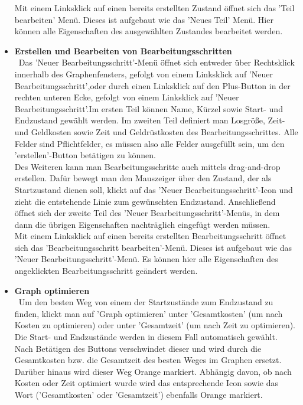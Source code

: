 \documentclass[twoside]{report}
\begin{document}
\begin{itemize}
      Mit einem Linksklick auf einen bereits erstellten Zustand öffnet sich das 'Teil bearbeiten' Menü. Dieses ist aufgebaut wie das 'Neues Teil' Menü. Hier können alle Eigenschaften des ausgewählten Zustandes bearbeitet werden.
  \item \textbf{ Erstellen und Bearbeiten von Bearbeitungsschritten }
    \\\
      Das 'Neuer Bearbeitungsschritt'-Menü öffnet sich entweder über Rechtsklick innerhalb des Graphenfensters, gefolgt von einem Linksklick auf 'Neuer Bearbeitungsschritt',oder durch einen Linksklick auf den Plus-Button in der rechten unteren Ecke, gefolgt von einem Linksklick auf 'Neuer Bearbeitungsschritt'.Im ersten Teil können Name, Kürzel sowie Start- und Endzustand gewählt werden. Im zweiten Teil definiert man Losgröße, Zeit- und Geldkosten sowie Zeit und Geldrüstkosten des Bearbeitungsschrittes. Alle Felder sind Pflichtfelder, es müssen also alle Felder ausgefüllt sein, um den 'erstellen'-Button betätigen zu können.\\
      Des Weiteren kann man Bearbeitungsschritte auch mittels drag-and-drop erstellen. Dafür bewegt man den Mauszeiger über den Zustand, der als Startzustand dienen soll, klickt auf das 'Neuer Bearbeitungsschritt'-Icon und zieht die entstehende Linie zum gewünschten Endzustand. Anschließend öffnet sich der zweite Teil des 'Neuer Bearbeitungsschritt'-Menüs, in dem dann die übrigen Eigenschaften  nachträglich eingefügt werden müssen.\\
      Mit einem Linksklick auf einen bereits erstellten Bearbeitungsschritt öffnet sich das 'Bearbeitungsschritt bearbeiten'-Menü. Dieses ist aufgebaut wie das 'Neuer Bearbeitungsschritt'-Menü. Es können hier alle Eigenschaften des angeklickten Bearbeitungsschritt geändert werden.
  \item \textbf{ Graph optimieren }
    \\\
      Um den besten Weg von einem der Startzustände zum Endzustand zu finden, klickt man auf 'Graph optimieren' unter 'Gesamtkosten' (um nach Kosten zu optimieren) oder unter 'Gesamtzeit' (um nach Zeit zu optimieren). Die Start- und Endzustände werden in diesem Fall automatisch gewählt. Nach Betätigen des Buttons verschwindet dieser und wird durch die Gesamtkosten bzw. die Gesamtzeit des besten Weges im Graphen ersetzt. Darüber hinaus wird dieser Weg Orange markiert. Abhängig davon, ob nach Kosten oder Zeit optimiert wurde wird das entsprechende Icon sowie das Wort ('Gesamtkosten' oder 'Gesamtzeit') ebenfalls Orange markiert.\\

\end{itemize}
\end{document}
